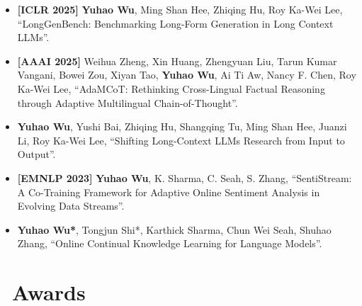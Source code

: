 \documentclass{resume}
\begin{document}
\begin{itemize}[parsep=0.5ex]
    \item[\textbf{--}] \textbf{[ICLR 2025]} \textbf{Yuhao Wu}, Ming Shan Hee, Zhiqing Hu, Roy Ka-Wei Lee, ``LongGenBench: Benchmarking Long-Form Generation in Long Context LLMs''.
    \item[\textbf{--}] \textbf{[AAAI 2025]} Weihua Zheng, Xin Huang, Zhengyuan Liu, Tarun Kumar Vangani, Bowei Zou, Xiyan Tao, \textbf{Yuhao Wu}, Ai Ti Aw, Nancy F. Chen, Roy Ka-Wei Lee, ``AdaMCoT: Rethinking Cross-Lingual Factual Reasoning through Adaptive Multilingual Chain-of-Thought''.
    \item[\textbf{--}] [arXiv 2025] \textbf{Yuhao Wu}, Yushi Bai, Zhiqing Hu, Shangqing Tu, Ming Shan Hee, Juanzi Li, Roy Ka-Wei Lee, ``Shifting Long-Context LLMs Research from Input to Output''.
    \item[\textbf{--}] \textbf{[EMNLP 2023]} \textbf{Yuhao Wu}, K. Sharma, C. Seah, S. Zhang, ``SentiStream: A Co-Training Framework for Adaptive Online Sentiment Analysis in Evolving Data Streams''.
    \item[\textbf{--}] [arXiv 2023] \textbf{Yuhao Wu*}, Tongjun Shi*, Karthick Sharma, Chun Wei Seah, Shuhao Zhang, ``Online Continual Knowledge Learning for Language Models''.
\end{itemize}

\section{\faHeartO\ Awards}
\end{document}

